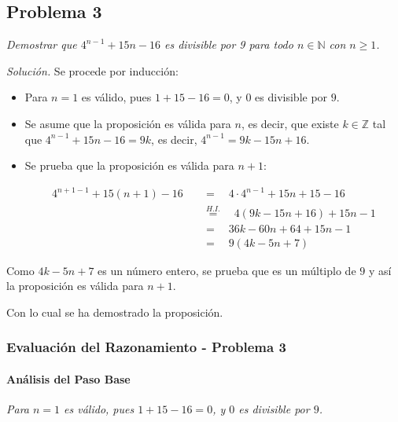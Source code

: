 \documentclass{article}
\begin{document}
\subsection{Problema 3}
\label{sec:problema-3}

\textit{Demostrar que $4^{n-1} + 15n - 16$ es divisible por 9 para todo $n \in \mathbb{N}$ con $n \ge 1$.}

\bigskip

\noindent \textit{Solución.} Se procede por inducción:

\begin{itemize}
    \item Para $n = 1$ es válido, pues $1 + 15 - 16 = 0$, y $0$ es divisible por $9$.
    \item Se asume que la proposición es válida para $n$, es decir, que existe $k \in \mathbb{Z}$ tal que $4^{n-1} + 15n - 16 = 9k$, es decir, $4^{n-1} = 9k - 15n + 16$.
    \item Se prueba que la proposición es válida para $n + 1$:
    
    \begin{align*}
    4^{n+1-1} + 15(n + 1) - 16 \quad &= \quad 4 \cdot 4^{n-1} + 15n + 15 - 16 \\
    &\stackrel{H.I.}{=} \quad 4(9k - 15n + 16) + 15n - 1 \\
    &= \quad 36k - 60n + 64 + 15n - 1 \\
    &= \quad 9 (4k - 5n + 7)
    \end{align*}
\end{itemize}

\noindent Como $4k - 5n + 7$ es un número entero, se prueba que es un múltiplo de $9$ y así la proposición es válida para $n + 1$.

\bigskip

\noindent Con lo cual se ha demostrado la proposición. 

\bigskip

\subsubsection{Evaluación del Razonamiento - Problema 3}
\label{sec:evaluacion-3}

\paragraph{Análisis del Paso Base}
\textit{Para $n = 1$ es válido, pues $1 + 15 - 16 = 0$, y $0$ es divisible por $9$.}
\end{document}
